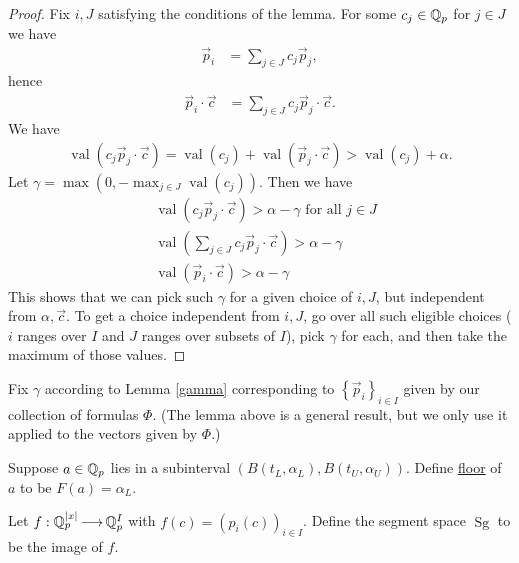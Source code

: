 \documentclass{amsart}
\newcommand{\curly}[1]{\left\{#1\right\}}
\newcommand{\paren}[1]{\left(#1\right)}
\DeclareMathOperator{\Sg}{Sg}
\DeclareMathOperator{\val}{val}
\newcommand{\defn}{\underline}
\begin{document}
\begin{proof}
  Fix $i, J$ satisfying the conditions of the lemma.
  For some $c_j \in \mathbb{Q}_p$ for $j \in J$ we have
  \begin{align*}
    \vec p_i &= \sum_{j \in J} c_j \vec p_j,
  \end{align*}
  hence
  \begin{align*}
    \vec p_i \cdot \vec c &= \sum_{j \in J} c_j \vec p_j \cdot \vec c.
  \end{align*}
  We have
  \begin{align*}
    \val \paren{c_j \vec p_j \cdot \vec c} = \val \paren{c_j} + \val \paren{\vec p_j \cdot \vec c} > \val \paren{c_j} + \alpha.
  \end{align*}
  Let $\gamma = \max(0, -\max_{j \in J} \val \paren{c_j})$.
  Then we have 
  \begin{align*}
    &\val \paren{c_j \vec p_j \cdot \vec c} > \alpha - \gamma \text{ for all $j \in J$}\\
    &\val \paren{\sum_{j \in J} c_j \vec p_j \cdot \vec c} > \alpha - \gamma \\
    &\val(\vec p_i \cdot \vec c) > \alpha - \gamma
  \end{align*}
  This shows that we can pick such $\gamma$ for a given choice of $i, J$, but independent from $\alpha, \vec c$.
  To get a choice independent from $i, J$, go over all such eligible choices 
  ($i$ ranges over $I$ and $J$ ranges over subsets of $I$),
  pick $\gamma$ for each, and then take the maximum of those values.
\end{proof}

Fix $\gamma$ according to Lemma \ref{gamma} corresponding to $\curly{\vec p_i}_{i \in I}$ given by our collection of formulas $\Phi$.
(The lemma above is a general result, but we only use it applied to the vectors given by $\Phi$.)

\begin{Definition}
  Suppose $a \in \mathbb{Q}_p$ lies in a subinterval $\paren{B(t_L, \alpha_L),  B(t_U, \alpha_U)}$.
  Define \defn{floor} of $a$ to be $F(a) = \alpha_L$.
\end{Definition}

\begin{Definition}
  Let $f: \mathbb{Q}_p^{|x|} \operatorname{\longrightarrow} \mathbb{Q}_p^I$ with $f(c) = (p_i(c))_{i \in I}$.
  Define the segment space $\Sg$ to be the image of $f$.	
\end{Definition}
\end{document}
